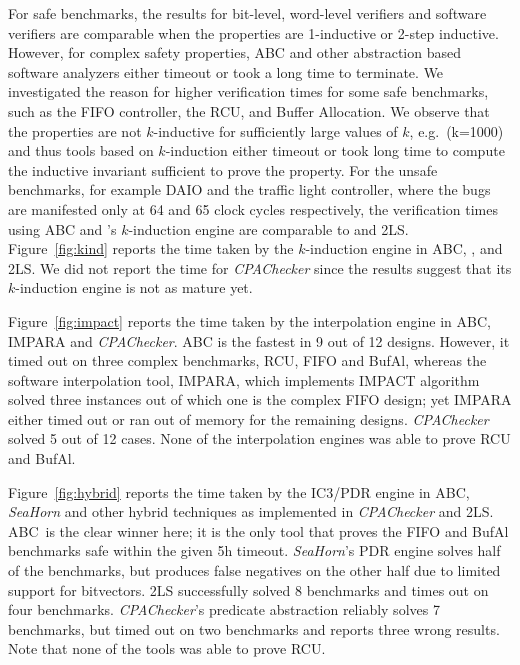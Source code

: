  For safe benchmarks, the results
for bit-level, word-level verifiers and software verifiers are
comparable when the properties are 1-inductive or 2-step inductive.
However, for complex safety properties, ABC and other abstraction
based software analyzers either timeout or took a long time to
terminate.  We investigated the reason for higher verification times
for some safe benchmarks, such as the FIFO controller, the RCU, and Buffer 
Allocation.  We observe that the properties are not $k$-inductive for
sufficiently large values of $k$, e.g.\ (k=1000) and thus tools based
on $k$-induction either timeout or took long time to
compute the inductive invariant sufficient to prove the property. For
the unsafe benchmarks, for example DAIO and the traffic light controller, where
the bugs are manifested only at 64 and 65 clock cycles respectively,
the verification times using ABC and \ebmc's $k$-induction engine 
are comparable to \cbmcv and \textsc{2LS}. Figure~\ref{fig:kind} 
reports the time taken by the $k$-induction engine in 
ABC, \ebmcv, \cbmcv and \textsc{2LS}.  We did not report
the time for \emph{CPAChecker} since the results suggest that 
its $k$-induction engine is not as mature yet. 

 Figure~\ref{fig:impact} reports
the time taken by the interpolation engine in ABC, \textsc{IMPARA}
and \emph{CPAChecker}. ABC is the fastest in 9 out of 12
designs. However, it timed out on three complex benchmarks, RCU, FIFO
and BufAl, whereas the software interpolation tool, \textsc{IMPARA},
which implements IMPACT algorithm solved three instances out of which
one is the complex FIFO design; yet \textsc{IMPARA} either timed out or
ran out of memory for the remaining designs.  \emph{CPAChecker} solved
5 out of 12 cases.  None of the interpolation engines was able to
prove RCU and BufAl.

 Figure~\ref{fig:hybrid}
reports the time taken by the IC3/PDR engine in ABC, \emph{SeaHorn}
and other hybrid techniques as implemented in \emph{CPAChecker} and
\textsc{2LS}. ABC~is the clear winner here; it is the only tool that
proves the FIFO and BufAl benchmarks safe within the given 5h timeout.
\emph{SeaHorn}'s PDR engine solves half of the benchmarks, but
produces false negatives on the other half due to limited support for
bitvectors. \textsc{2LS} successfully solved 8 benchmarks and times 
out on four benchmarks.  \emph{CPAChecker}'s predicate abstraction reliably
solves 7 benchmarks, but timed out on two benchmarks and reports three
wrong results. Note that none of the tools was able to prove RCU.

